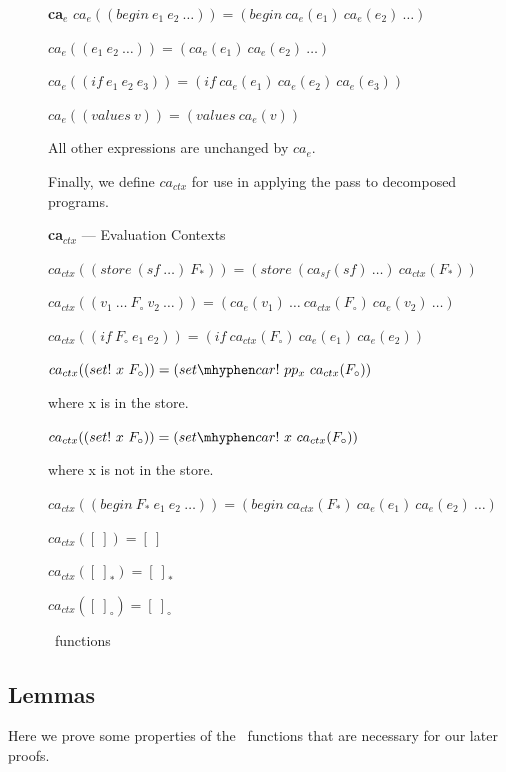 \begin{figure}
\begin{definition} {\large\textbf{ca$_e$}}
$ca_e((begin\ e_1\ e_2\ \dots)) = (begin\ ca_e(e_1)\ ca_e(e_2)\ \dots)$

$ca_e((e_1\ e_2\ \dots)) = (ca_e(e_1)\ ca_e(e_2)\ \dots)$

$ca_e((if\ e_1\ e_2\ e_3)) = (if\ ca_e(e_1)\ ca_e(e_2)\ ca_e(e_3))$

$ca_e((values\ v)) = (values\ ca_e(v))$

All other expressions are unchanged by $ca_e$.

\end{definition}

Finally, we define $ca_{ctx}$ for use in applying the pass to decomposed programs.

\begin{definition} {\large\textbf{ca$_{ctx}$}} --- Evaluation Contexts

$ca_{ctx}((store\ (sf\ \dots)\ F_{*})) = (store\ (ca_{sf}(sf)\ \dots)\ ca_{ctx}(F_{*}))$

$ca_{ctx}((v_1\ \dots\ F_{\circ}\ v_2\ \dots)) = (ca_e(v_1)\ \dots\ ca_{ctx}(F_{\circ})\ ca_e(v_2)\ \dots)$

$ca_{ctx}((if\ F_{\circ}\ e_1\ e_2)) = (if\ ca_{ctx}(F_{\circ})\ ca_e(e_1)\ ca_e(e_2))$

$ca_{ctx}((set!\ x\ F_{\circ})) = (set \mhyphen car!\ pp_x\ ca_{ctx}(F_{\circ}))$

\qquad where x is in the store.

$ca_{ctx}((set!\ x\ F_{\circ})) = (set \mhyphen car!\ x\ ca_{ctx}(F_{\circ}))$

\qquad where x is not in the store.

$ca_{ctx}((begin\ F_{*}\ e_1\ e_2\ \dots)) = (begin\ ca_{ctx}(F_{*})\ ca_e(e_1)\ ca_e(e_2)\ \dots)$

$ca_{ctx}([\ ]) = [\ ]$

$ca_{ctx}([\ ]_{*}) = [\ ]_{*}$

$ca_{ctx}([\ ]_{\circ}) = [\ ]_{\circ}$

\end{definition}
    \caption{\caname\ functions}
    \label{fig:ca_fxs}
\end{figure}
\newpage

\subsection{Lemmas}
Here we prove some properties of the \caname\ functions that are necessary for our later proofs.

